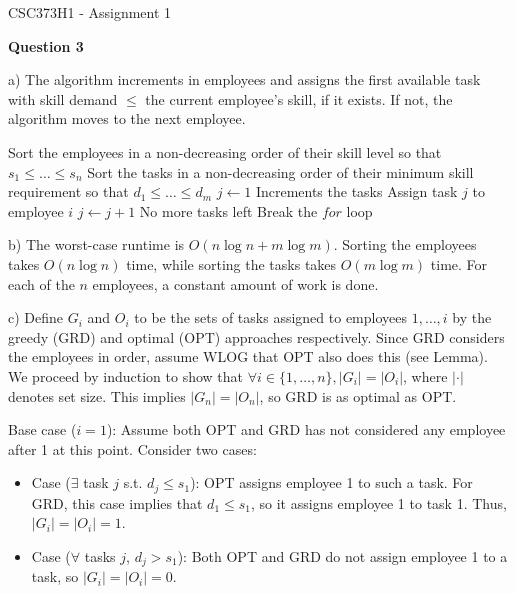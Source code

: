 \documentclass[11pt]{article}
\begin{document}
\begin{center}
{\Large CSC373H1 - Assignment 1}
\end{center}

\textbf{Question 3}

a) The algorithm increments in employees and assigns the first available task with skill demand $\leq$ the current employee's skill, if it exists. If not, the algorithm moves to the next employee.

\begin{algorithm}[H]
\caption{Task Assignment}
\begin{algorithmic}[1]
\State Sort the employees in a non-decreasing order of their skill level so that $s_1 \leq \ldots \leq s_n$
\State Sort the tasks in a non-decreasing order of their minimum skill requirement so that $d_1 \leq \ldots \leq d_m$
\State $j \gets 1$ \Comment Increments the tasks
    \State Assign task $j$ to employee $i$
    \State $j \gets j + 1$
\EndIf
{} \Comment No more tasks left
    \State Break the $for$ loop \EndIf
\EndFor
\end{algorithmic}
\end{algorithm}

b) The worst-case runtime is $O(n\log n + m\log m)$. Sorting the employees takes $O(n\log n)$ time, while sorting the tasks takes $O(m\log m)$ time. For each of the $n$ employees, a constant amount of work is done.

c) Define $G_i$ and $O_i$ to be the sets of tasks assigned to employees $1,\ldots,i$ by the greedy (GRD) and optimal (OPT) approaches respectively. Since GRD considers the employees in order, assume WLOG that OPT also does this (see Lemma). We proceed by induction to show that $\forall i\in\{1,\ldots,n\},|G_i|=|O_i|$, where $|\cdot|$ denotes set size. This implies $|G_n|=|O_n|$, so GRD is as optimal as OPT.

Base case ($i=1$): Assume both OPT and GRD has not considered any employee after 1 at this point. Consider two cases:

\begin{itemize}
    \item Case ($\exists$ task $j$ s.t. $d_j\leq s_1$): OPT assigns employee 1 to such a task. For GRD, this case implies that $d_1\leq s_1$, so it assigns employee 1 to task 1. Thus, $|G_i|=|O_i|=1$.
    \item Case ($\forall$ tasks $j$, $d_j > s_1$): Both OPT and GRD do not assign employee 1 to a task, so $|G_i|=|O_i|=0$.
\end{itemize}
\end{document}
